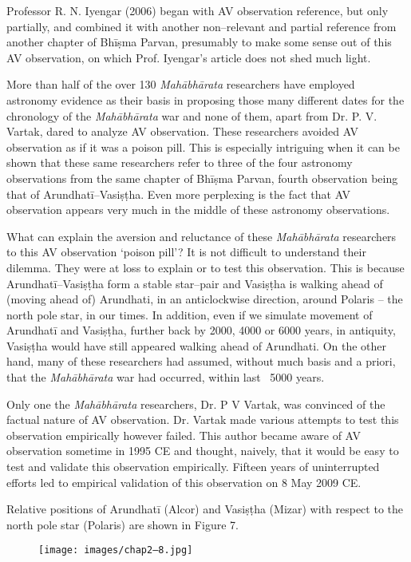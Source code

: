 Professor R. N. Iyengar (2006) began with AV observation reference, but only partially, and combined it with another non–relevant and partial reference from another chapter of Bhīṣma Parvan, presumably to make some sense out of this AV observation, on which Prof. Iyengar’s article does not shed much light.

More than half of the over 130 \textit{Mahābhārata} researchers have employed astronomy evidence as their basis in proposing those many different dates for the chronology of the \textit{Mahābhārata} war and none of them, apart from Dr. P. V. Vartak, dared to analyze AV observation. These researchers avoided AV observation as if it was a poison pill. This is especially intriguing when it can be shown that these same researchers refer to three of the four astronomy observations from the same chapter of Bhīṣma Parvan, fourth observation being that of Arundhatī–Vasiṣṭha. Even more perplexing is the fact that AV observation appears very much in the middle of these astronomy observations.

What can explain the aversion and reluctance of these \textit{Mahābhārata} researchers to this AV observation ‘poison pill’? It is not difficult to understand their dilemma. They were at loss to explain or to test this observation. This is because Arundhatī–Vasiṣṭha form a stable star–pair and Vasiṣṭha is walking ahead of (moving ahead of) Arundhati, in an anticlockwise direction, around Polaris – the north pole star, in our times. In addition, even if we simulate movement of Arundhatī and Vasiṣṭha, further back by 2000, 4000 or 6000 years, in antiquity, Vasiṣṭha would have still appeared walking ahead of Arundhati. On the other hand, many of these researchers had assumed, without much basis and a priori, that the \textit{Mahābhārata} war had occurred, within last ~5000 years.

Only one the \textit{Mahābhārata} researchers, Dr. P V Vartak, was convinced of the factual nature of AV observation. Dr. Vartak made various attempts to test this observation empirically however failed. This author became aware of AV observation sometime in 1995 CE and thought, naively, that it would be easy to test and validate this observation empirically. Fifteen years of uninterrupted efforts led to empirical validation of this observation on 8 May 2009 CE.

Relative positions of Arundhatī (Alcor) and Vasiṣṭha (Mizar) with respect to the north pole star (Polaris) are shown in Figure 7.

\begin{figure}
\texttt{[image: images/chap2–8.jpg]}
\end{figure}

